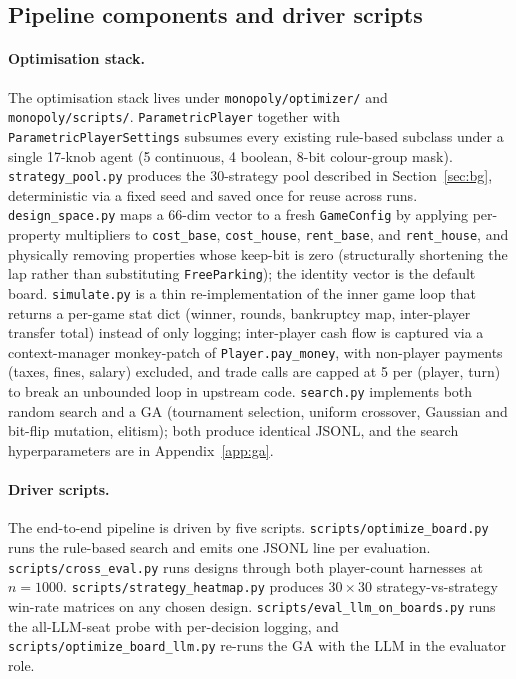 \documentclass[10pt]{article}
\begin{document}
\subsection{Pipeline components and driver scripts}\label{app:pipeline}

\paragraph{Optimisation stack.} The optimisation stack lives under
\texttt{monopoly/optimizer/} and \texttt{monopoly/scripts/}.
\texttt{ParametricPlayer} together with
\texttt{ParametricPlayerSettings} subsumes every existing
rule-based subclass under a single 17-knob agent (5 continuous, 4
boolean, 8-bit colour-group mask).
\texttt{strategy\_pool.py} produces the 30-strategy pool described
in Section~\ref{sec:bg}, deterministic via a fixed seed and saved
once for reuse across runs.
\texttt{design\_space.py} maps a 66-dim vector to a fresh
\texttt{GameConfig} by applying per-property multipliers to
\texttt{cost\_base}, \texttt{cost\_house}, \texttt{rent\_base}, and
\texttt{rent\_house}, and physically removing properties whose
keep-bit is zero (structurally shortening the lap rather than
substituting \texttt{FreeParking}); the identity vector is the
default board.
\texttt{simulate.py} is a thin re-implementation of the inner game
loop that returns a per-game stat dict (winner, rounds, bankruptcy
map, inter-player transfer total) instead of only logging;
inter-player cash flow is captured via a context-manager
monkey-patch of \texttt{Player.pay\_money}, with non-player
payments (taxes, fines, salary) excluded, and trade calls are
capped at 5 per (player, turn) to break an unbounded loop in
upstream code.
\texttt{search.py} implements both random search and a GA
(tournament selection, uniform crossover, Gaussian and bit-flip
mutation, elitism); both produce identical JSONL, and the search
hyperparameters are in Appendix~\ref{app:ga}.

\paragraph{Driver scripts.} The end-to-end pipeline is driven by
five scripts. \texttt{scripts/optimize\_board.py} runs the
rule-based search and emits one JSONL line per evaluation.
\texttt{scripts/cross\_eval.py} runs designs through both
player-count harnesses at $n{=}1000$.
\texttt{scripts/strategy\_heatmap.py} produces $30{\times}30$
strategy-vs-strategy win-rate matrices on any chosen design.
\texttt{scripts/eval\_llm\_on\_boards.py} runs the all-LLM-seat
probe with per-decision logging, and
\texttt{scripts/optimize\_board\_llm.py} re-runs the GA with the
LLM in the evaluator role.
\end{document}
